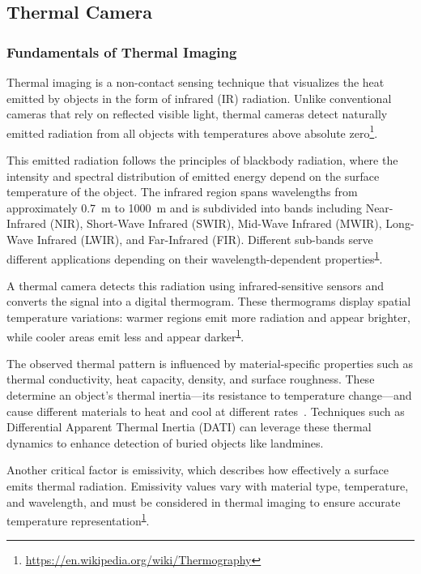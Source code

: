 \subsection{Thermal Camera}

\subsubsection{Fundamentals of Thermal Imaging}

Thermal imaging is a non-contact sensing technique that visualizes the heat emitted by objects in the form of infrared (IR) radiation. Unlike conventional cameras that rely on reflected visible light, thermal cameras detect naturally emitted radiation from all objects with temperatures above absolute zero\footnote{\label{thermography}\url{https://en.wikipedia.org/wiki/Thermography}}.

This emitted radiation follows the principles of blackbody radiation, where the intensity and spectral distribution of emitted energy depend on the surface temperature of the object. The infrared region spans wavelengths from approximately 0.7~\textmu m to 1000~\textmu m and is subdivided into bands including Near-Infrared (NIR), Short-Wave Infrared (SWIR), Mid-Wave Infrared (MWIR), Long-Wave Infrared (LWIR), and Far-Infrared (FIR). Different sub-bands serve different applications depending on their wavelength-dependent properties\textsuperscript{\ref{thermography}}.

A thermal camera detects this radiation using infrared-sensitive sensors and converts the signal into a digital thermogram. These thermograms display spatial temperature variations: warmer regions emit more radiation and appear brighter, while cooler areas emit less and appear darker\textsuperscript{\ref{thermography}}.

The observed thermal pattern is influenced by material-specific properties such as thermal conductivity, heat capacity, density, and surface roughness. These determine an object’s thermal inertia—its resistance to temperature change—and cause different materials to heat and cool at different rates~\cite{nikulin2018detection}. Techniques such as Differential Apparent Thermal Inertia (DATI) can leverage these thermal dynamics to enhance detection of buried objects like landmines.

Another critical factor is emissivity, which describes how effectively a surface emits thermal radiation. Emissivity values vary with material type, temperature, and wavelength, and must be considered in thermal imaging to ensure accurate temperature representation\textsuperscript{\ref{thermography}}.


